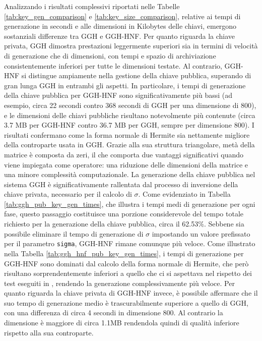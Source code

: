 Analizzando i risultati complessivi riportati nelle Tabelle \ref{tab:key_gen_comparison} e 
\ref{tab:key_size_comparison}, relative ai tempi di generazione 
in secondi e alle dimensioni in Kilobytes delle chiavi, emergono sostanziali differenze tra GGH e GGH-HNF.
Per quanto riguarda la chiave privata, GGH dimostra prestazioni leggermente superiori 
sia in termini di velocità di generazione che di dimensioni, con tempi e spazio di 
archiviazione consistentemente inferiori per tutte le dimensioni testate. Al contrario, 
GGH-HNF si distingue ampiamente nella gestione della chiave pubblica, superando di gran 
lunga GGH in entrambi gli aspetti. In particolare, i tempi di generazione della chiave 
pubblica per GGH-HNF sono significativamente più bassi (ad esempio, circa 22 secondi 
contro 368 secondi di GGH per una dimensione di 800), e le dimensioni delle chiavi 
pubbliche risultano notevolmente più contenute (circa 3.7 MB per GGH-HNF contro 36.7 MB 
per GGH, sempre per dimensione 800). I risultati confermano come la forma normale di 
Hermite sia nettamente migliore della controparte usata in GGH. 
Grazie alla sua struttura triangolare, metà della matrice è composta da zeri, 
il che comporta due vantaggi significativi quando viene impiegata come operatore: 
una riduzione delle dimensioni della matrice e una minore complessità computazionale.
La generazione della chiave pubblica nel sistema GGH è significativamente rallentata 
dal processo di inversione della chiave privata, necessario per il calcolo di $\sigma$. 
Come evidenziato in Tabella \ref{tab:ggh_pub_key_gen_times}, che illustra i tempi medi 
di generazione per ogni fase, questo passaggio costituisce una porzione considerevole 
del tempo totale richiesto per la generazione della chiave pubblica, circa il 62.53\%. 
Sebbene sia possibile eliminare il tempo di generazione di $\sigma$ impostando un valore 
prefissato per il parametro \texttt{sigma}, GGH-HNF rimane comunque più veloce. 
Come illustrato nella Tabella \ref{tab:ggh_hnf_pub_key_gen_times}, 
i tempi di generazione per GGH-HNF sono dominati dal calcolo della forma normale di Hermite,
che però risultano sorprendentemente inferiori  a quello che ci si aspettava nel 
rispetto dei test eseguiti in \cite{HNF04}, rendendo la generazione 
complessivamente più veloce. Per quanto riguarda la chiave 
privata di GGH-HNF invece, è possibile affermare che il suo tempo di generazione medio è trascurabilmente
superiore a quello di GGH, con una differenza di circa 4 secondi in dimensione 800. Al contrario
la dimensione è maggiore di circa 1.1MB rendendola quindi di qualità inferiore rispetto alla
sua controparte. 
    
